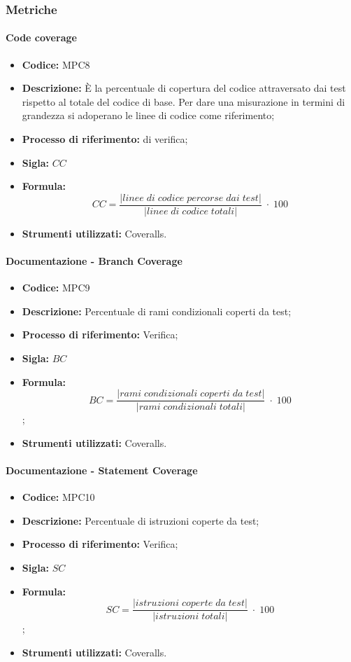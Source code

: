 \subsubsection{Metriche}

\paragraph{Code coverage}
\begin{itemize}
	\item \textbf{Codice:} MPC8
	\item \textbf{Descrizione:} È la percentuale di copertura del codice attraversato dai test rispetto al totale del codice di base. Per dare una misurazione in termini di grandezza si adoperano le linee di codice come riferimento;
	\item \textbf{Processo di riferimento:}  di verifica;
	\item \textbf{Sigla:} $CC$
	\item \textbf{Formula:} $$CC = \frac{|linee \; di \; codice \; percorse \; dai  \; test|}{|linee \; di \; codice \; totali|} \; \cdot \; 100$$
	\item \textbf{Strumenti utilizzati:} Coveralls.
\end{itemize}

\paragraph{Documentazione - Branch Coverage}
\begin{itemize}
    \item \textbf{Codice:} MPC9
    \item \textbf{Descrizione:} Percentuale di rami condizionali coperti da test;
    \item \textbf{Processo di riferimento:} Verifica;
    \item \textbf{Sigla:} $BC$
    \item \textbf{Formula:} $$BC = \frac{|rami \; condizionali \; coperti \; da \; test|}{|rami \; condizionali \; totali|} \; \cdot \; 100$$;
    \item \textbf{Strumenti utilizzati:} Coveralls.
\end{itemize}

\paragraph{Documentazione - Statement Coverage}
\begin{itemize}
    \item \textbf{Codice:} MPC10
    \item \textbf{Descrizione:} Percentuale di istruzioni coperte da test;
    \item \textbf{Processo di riferimento:} Verifica;
    \item \textbf{Sigla:} $SC$
    \item \textbf{Formula:} $$SC = \frac{|istruzioni \; coperte \; da \; test|}{|istruzioni \; totali|} \; \cdot \; 100$$;
    \item \textbf{Strumenti utilizzati:} Coveralls.
\end{itemize}

